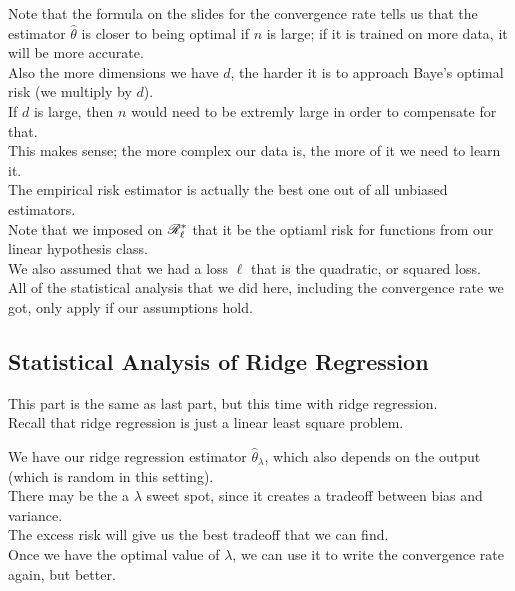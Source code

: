 \documentclass[12pt]{article}
\begin{document}
Note that the formula on the slides for the
convergence rate tells us that the estimator $\hat{\theta}$
is closer to being optimal if $n$ is large;
if it is trained on more data, it will be more accurate. \\

Also the more dimensions we have $d$,
the harder it is to approach Baye's optimal 
risk (we multiply by $d$). \\

If $d$ is large, then $n$ would need to be extremly
large in order to compensate for that. \\
This makes sense; the more complex our data is,
the more of it we need to learn it. \\

The empirical risk estimator is actually the best
one out of all unbiased estimators. \\

Note that we imposed on $\mathscr{R}_{\ell}^*$
that it be the optiaml risk for functions
from our linear hypothesis class. \\
We also assumed that we had a loss $\ell$
that is the quadratic, or squared loss. \\
All of the statistical analysis that we did 
here, including the convergence rate we got,
only apply if our assumptions hold. \\

\newpage

\subsection*{Statistical Analysis of Ridge Regression}

This part is the same as last part, but this time
with ridge regression. \\

Recall that ridge regression is just
a linear least square problem.

We have our ridge regression estimator 
$\hat{\theta}_\lambda$,
which also depends on the output
(which is random in this setting). \\

There may be the a $\lambda$ sweet spot,
since it creates a tradeoff between bias
and variance. \\

The excess risk will give us the best
tradeoff that we can find. \\

Once we have the optimal value of $\lambda$,
we can use it to write the convergence
rate again, but better. \\
\end{document}
